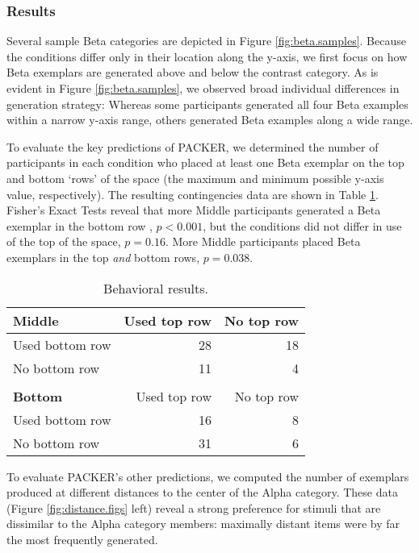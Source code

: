 \documentclass[10pt,letterpaper]{article}
\begin{document}
\subsubsection{Results}

Several sample Beta categories are depicted in Figure \ref{fig:beta.samples}. Because the conditions differ only in their location along the y-axis, we first focus on how Beta exemplars are generated above and below the contrast category. As is evident in Figure \ref{fig:beta.samples}, we observed broad individual differences in generation strategy: Whereas some participants generated all four Beta examples within a narrow y-axis range, others generated Beta examples along a wide range. 

To evaluate the key predictions of PACKER, we determined the number of participants in each condition who placed at least one Beta exemplar on the top and bottom `rows' of the space (the maximum and minimum possible y-axis value, respectively). The resulting contingencies data are shown in Table \ref{table:subset-table}. Fisher's Exact Tests reveal that more Middle participants generated a Beta exemplar in the bottom row , $p < 0.001$, but the conditions did not differ in use of the top of the space, $p = 0.16$. More Middle participants placed Beta exemplars in the top \textit{and} bottom rows, $p = 0.038$. 

\begin{table}
\begin{center} 
\caption{Behavioral results.} 
\label{table:subset-table} 
\vskip 0.12in
\begin{tabular}{ l r r}
    \textbf{Middle}         & Used top row & No top row \\
    \hline
    Used bottom row       &  28 & 18  \\
    No bottom row          &  11 &  4  \\
    \\
    \textbf{Bottom}         & Used top row & No top row \\
    \hline
    Used bottom row        & 16 & 8 \\
    No bottom row          & 31 & 6 \\
\end{tabular}
\end{center} 
\end{table}

To evaluate PACKER's other predictions, we computed the number of exemplars produced at different distances to the center of the Alpha category. These data (Figure \ref{fig:distance.figs} left) reveal a strong preference for stimuli that are dissimilar to the Alpha category members: maximally distant items were by far the most frequently generated. 
\end{document}
